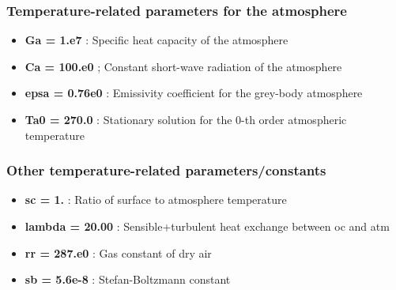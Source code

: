 \documentclass[letterpaper,10pt,english]{sphinxmanual}
\begin{document}
\subsubsection{Temperature-related parameters for the atmosphere}
\label{rstfiles/params_maooam:temperature-related-parameters-for-the-atmosphere}\begin{itemize}
\item {} 
\textbf{Ga = 1.e7}  : Specific heat capacity of the atmosphere

\item {} 
\textbf{Ca = 100.e0}  ; Constant short-wave radiation of the atmosphere

\item {} 
\textbf{epsa = 0.76e0}  : Emissivity coefficient for the grey-body atmosphere

\item {} 
\textbf{Ta0 = 270.0}  : Stationary solution for the 0-th order atmospheric temperature

\end{itemize}


\subsubsection{Other temperature-related parameters/constants}
\label{rstfiles/params_maooam:other-temperature-related-parameters-constants}\begin{itemize}
\item {} 
\textbf{sc = 1.}  : Ratio of surface to atmosphere temperature

\item {} 
\textbf{lambda = 20.00}  : Sensible+turbulent heat exchange between oc and atm

\item {} 
\textbf{rr = 287.e0}  : Gas constant of dry air

\item {} 
\textbf{sb = 5.6e-8}  : Stefan-Boltzmann constant

\end{itemize}
\end{document}
